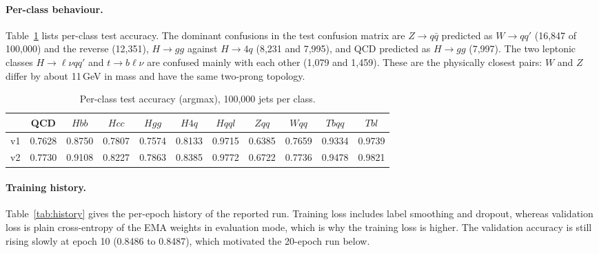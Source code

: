 \documentclass[11pt,a4paper]{article}
\numberwithin{equation}{section}
\begin{document}
\paragraph{Per-class behaviour.} Table~\ref{tab:perclass} lists per-class test accuracy. The
dominant confusions in the test confusion matrix are $Z\to q\bar q$ predicted as $W\to qq'$
(16,847 of 100,000) and the reverse (12,351), $H\to gg$ against $H\to 4q$ (8,231 and 7,995),
and QCD predicted as $H\to gg$ (7,997). The two leptonic classes $H\to\ell\nu qq'$ and
$t\to b\ell\nu$ are confused mainly with each other (1,079 and 1,459). These are the
physically closest pairs: $W$ and $Z$ differ by about 11\,GeV in mass and have the same two-prong
topology.

\begin{table}[ht]
\centering\small
\begin{tabular}{lcccccccccc}
\toprule
 & QCD & $Hbb$ & $Hcc$ & $Hgg$ & $H4q$ & $Hqql$ & $Zqq$ & $Wqq$ & $Tbqq$ & $Tbl$\\ \midrule
v1 & 0.7628 & 0.8750 & 0.7807 & 0.7574 & 0.8133 & 0.9715 & 0.6385 & 0.7659 & 0.9334 & 0.9739\\
v2 & 0.7730 & 0.9108 & 0.8227 & 0.7863 & 0.8385 & 0.9772 & 0.6722 & 0.7736 & 0.9478 & 0.9821\\
\bottomrule
\end{tabular}
\caption{Per-class test accuracy (argmax), 100,000 jets per class.}
\label{tab:perclass}
\end{table}

\paragraph{Training history.} Table~\ref{tab:history} gives the per-epoch history of the
reported run. Training loss includes label smoothing and dropout, whereas validation loss is plain
cross-entropy of the EMA weights in evaluation mode, which is why the training loss is higher. The
validation accuracy is still rising slowly at epoch 10 (0.8486 to 0.8487), which motivated the
20-epoch run below.
\end{document}
